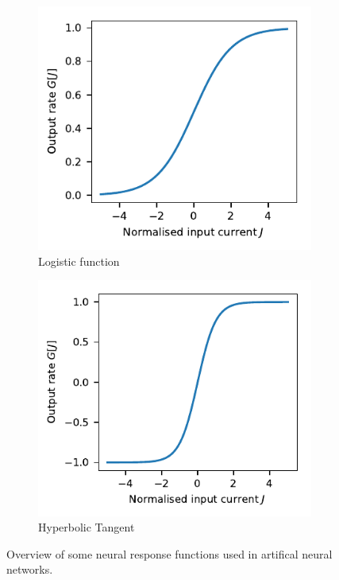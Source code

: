 \documentclass[10pt,letterpaper,oneside]{article}
\begin{document}
\begin{figure}
\begin{subfigure}{0.5\textwidth}
	\end{subfigure}
	\begin{subfigure}{0.5\textwidth}%
		\centering%
		\includegraphics{media/nonlinearity_logistic.pdf}%
		\caption{Logistic function}%
		\label{fig:artificial_neurons_logistic}
	\end{subfigure}%
	\begin{subfigure}{0.5\textwidth}%
		\centering%
		\includegraphics{media/nonlinearity_tanh.pdf}%
		\caption{Hyperbolic Tangent}%
		\label{fig:artificial_neurons_tanh}
	\end{subfigure}
	\caption{Overview of some neural response functions used in artifical neural networks. }
	\label{fig:artificial_neurons}
\end{figure}
\end{document}
